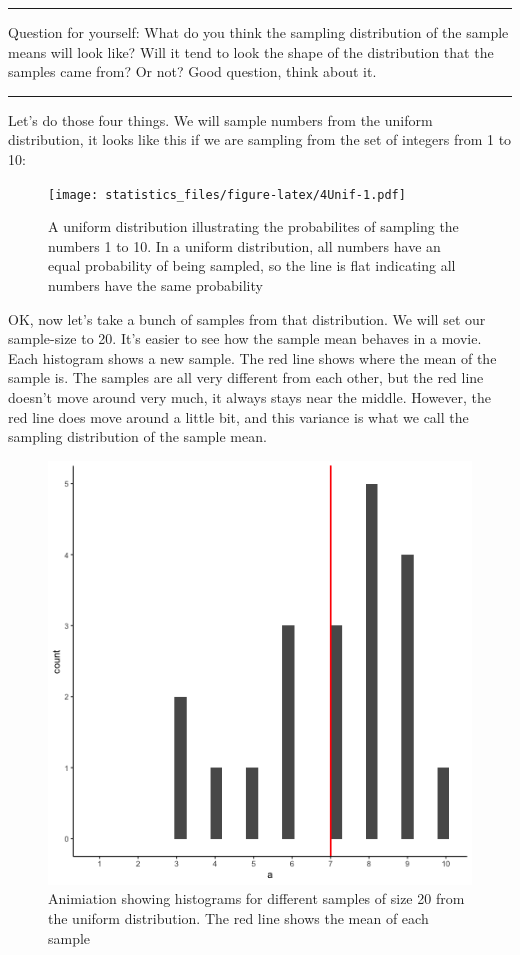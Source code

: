 \documentclass[]{book}
\begin{document}
\begin{center}\rule{0.5\linewidth}{0.5pt}\end{center}

Question for yourself: What do you think the sampling distribution of the sample means will look like? Will it tend to look the shape of the distribution that the samples came from? Or not? Good question, think about it.

\begin{center}\rule{0.5\linewidth}{0.5pt}\end{center}

Let's do those four things. We will sample numbers from the uniform distribution, it looks like this if we are sampling from the set of integers from 1 to 10:

\begin{figure}
\centering
\texttt{[image: statistics\_files/figure-latex/4Unif-1.pdf]}
\caption{\label{fig:4Unif}A uniform distribution illustrating the probabilites of sampling the numbers 1 to 10. In a uniform distribution, all numbers have an equal probability of being sampled, so the line is flat indicating all numbers have the same probability}
\end{figure}

OK, now let's take a bunch of samples from that distribution. We will set our sample-size to 20. It's easier to see how the sample mean behaves in a movie. Each histogram shows a new sample. The red line shows where the mean of the sample is. The samples are all very different from each other, but the red line doesn't move around very much, it always stays near the middle. However, the red line does move around a little bit, and this variance is what we call the sampling distribution of the sample mean.

\begin{figure}
\centering
\includegraphics{gifs/sampleHistUnif-1.gif}
\caption{\label{fig:4sample20unif}Animiation showing histograms for different samples of size 20 from the uniform distribution. The red line shows the mean of each sample}
\end{figure}
\end{document}
